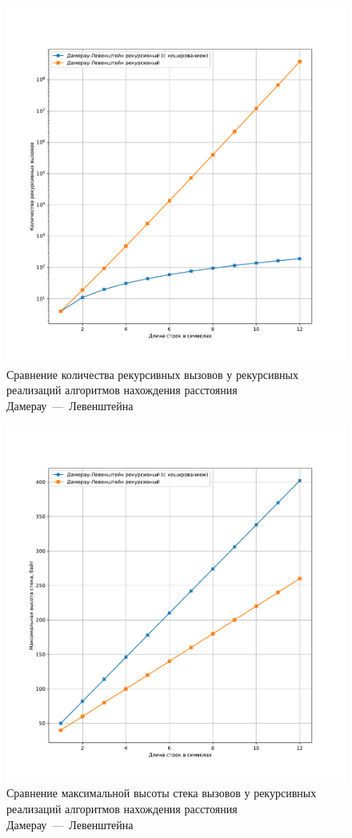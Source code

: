 \begin{figure}[H]
	\centering
	\includegraphics[width=\textwidth]{img/fn_rec_calls.pdf}
	\caption{Сравнение количества рекурсивных вызовов у рекурсивных реализаций алгоритмов нахождения расстояния Дамерау~---~Левенштейна}
	\label{fig:fn_rec_calls}
\end{figure}

\begin{figure}[H]
	\centering
	\includegraphics[width=\textwidth]{img/fn_max_stack.pdf}
	\caption{Сравнение максимальной высоты стека вызовов у рекурсивных реализаций алгоритмов нахождения расстояния Дамерау~---~Левенштейна}
	\label{fig:fn_max_stack}
\end{figure}

